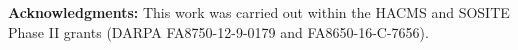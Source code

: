 \documentclass[10pt, conference]{IEEEtran}
\begin{document}


%


%











%






\textbf{Acknowledgments:} This work was carried out within the HACMS and SOSITE Phase II grants (DARPA FA8750-12-9-0179 and FA8650-16-C-7656).





~
\end{document}
